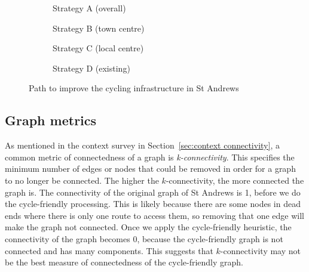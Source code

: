 \documentclass[12pt,a4paper]{report}
\begin{document}
\begin{figure}[ht]
    \centering
    \begin{subfigure}[ht]{0.47\textwidth}
        \centering
        
        \caption{Strategy A (overall)}
        \label{fig:overall st andrews}
    \end{subfigure}
    \hfill
    \begin{subfigure}[ht]{0.47\textwidth}
        \centering
        
        \caption{Strategy B (town centre)}
        \label{fig:centre st andrews}
    \end{subfigure}
    \hfill
    \begin{subfigure}[ht]{0.47\textwidth}
        \centering
        
        \caption{Strategy C (local centre)}
        \label{fig:local st andrews}
    \end{subfigure}
    \hfill
    \begin{subfigure}[ht]{0.47\textwidth}
        \centering
        
        \caption{Strategy D (existing)}
        \label{fig:existing st andrews}
    \end{subfigure}
       \caption{Path to improve the cycling infrastructure in St Andrews}
       \label{fig:path st andrews}
\end{figure}

\subsection{Graph metrics}\label{sec:metrics}
As mentioned in the context survey in Section~\ref{sec:context connectivity}, a common metric of connectedness of a graph is \textit{k-connectivity}. This specifies the minimum number of edges or nodes that could be removed in order for a graph to no longer be connected. The higher the $k$-connectivity, the more connected the graph is. The connectivity of the original graph of St Andrews is 1, before we do the cycle-friendly processing. This is likely because there are some nodes in dead ends where there is only one route to access them, so removing that one edge will make the graph not connected. Once we apply the cycle-friendly heuristic, the connectivity of the graph becomes 0, because the cycle-friendly graph is not connected and has many components. This suggests that $k$-connectivity may not be the best measure of connectedness of the cycle-friendly graph.
\end{document}
